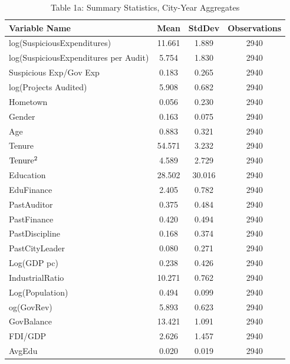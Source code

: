 \begin{table}[p]\centering\footnotesize{
\captionsetup{width=\textwidth,labelformat=empty}
\caption{Table 1a: Summary Statistics, City-Year Aggregates}
\begin{threeparttable}
\begin{tabular}{l  c c c }
\hline\hline
Variable Name & Mean & StdDev & Observations  \\
\hline
log(SuspiciousExpenditures)&11.661&1.889&2940\\
log(SuspiciousExpenditures per Audit)&5.754&1.830&2940\\
Suspicious Exp/Gov Exp&0.183&0.265&2940\\
log(Projects Audited)&5.908&0.682&2940\\
Hometown&0.056&0.230&2940\\
Gender&0.163&0.075&2940\\
Age&0.883&0.321&2940\\
Tenure&54.571&3.232&2940\\
\(\rm Tenure^2 \)&4.589&2.729&2940\\
Education&28.502&30.016&2940\\
EduFinance&2.405&0.782&2940\\
PastAuditor&0.375&0.484&2940\\
PastFinance&0.420&0.494&2940\\
PastDiscipline&0.168&0.374&2940\\
PastCityLeader&0.080&0.271&2940\\
Log(GDP pc)&0.238&0.426&2940\\
IndustrialRatio&10.271&0.762&2940\\
Log(Population)&0.494&0.099&2940\\
og(GovRev)&5.893&0.623&2940\\
GovBalance&13.421&1.091&2940\\
FDI/GDP&2.626&1.457&2940\\
AvgEdu&0.020&0.019&2940\\
\hline\hline
\end{tabular}
\captionsetup{justification=justified,labelformat=empty}

\end{threeparttable}}
\end{table}

